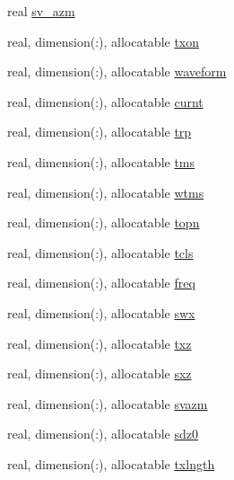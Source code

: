\begin{DoxyCompactItemize}
\item 
real \hyperlink{namespacelg__input__routines_adf00d31a387ab979268c6e7173a1c781}{sv\+\_\+azm}
\item 
real, dimension(\+:), allocatable \hyperlink{namespacelg__input__routines_a9ea6fe9c73da602e7448aa2684a035fe}{txon}
\item 
real, dimension(\+:), allocatable \hyperlink{namespacelg__input__routines_a7966da9a09991ee20d62ae7374806c50}{waveform}
\item 
real, dimension(\+:), allocatable \hyperlink{namespacelg__input__routines_a2724872da9ddfe9b94de8c091b0a36dd}{curnt}
\item 
real, dimension(\+:), allocatable \hyperlink{namespacelg__input__routines_a664cea039ac7180e824012883beeb9fe}{trp}
\item 
real, dimension(\+:), allocatable \hyperlink{namespacelg__input__routines_a5568c5b399e14b491242b1b073be4b54}{tms}
\item 
real, dimension(\+:), allocatable \hyperlink{namespacelg__input__routines_a14a35edab0eb9da183da23d0efa95eba}{wtms}
\item 
real, dimension(\+:), allocatable \hyperlink{namespacelg__input__routines_aed3c58e52c5a1fda12def41c6995d7dd}{topn}
\item 
real, dimension(\+:), allocatable \hyperlink{namespacelg__input__routines_a634432267302a002552b9ca3feedb429}{tcls}
\item 
real, dimension(\+:), allocatable \hyperlink{namespacelg__input__routines_a2c092becc43cb2313a011cc8e3962349}{freq}
\item 
real, dimension(\+:), allocatable \hyperlink{namespacelg__input__routines_afe41d8f3c1483586b6ddc9f4d7193b46}{swx}
\item 
real, dimension(\+:), allocatable \hyperlink{namespacelg__input__routines_a1a991d972a51bc60707aadd4e0f5bcef}{txz}
\item 
real, dimension(\+:), allocatable \hyperlink{namespacelg__input__routines_a80924219ecce4e0ceb69bac59e6aefd4}{sxz}
\item 
real, dimension(\+:), allocatable \hyperlink{namespacelg__input__routines_ae702b8abf69e5b12bf96b026b2b112a8}{svazm}
\item 
real, dimension(\+:), allocatable \hyperlink{namespacelg__input__routines_a24da2d57446e220190d24b7ba6d7b050}{sdz0}
\item 
real, dimension(\+:), allocatable \hyperlink{namespacelg__input__routines_a607132f2ff751541dc97a344f7079627}{txlngth}
\item 

\end{DoxyCompactItemize}
